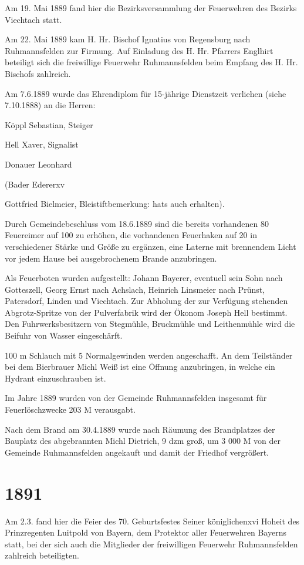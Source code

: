 \documentclass[12pt,a4paper]{book}
\begin{document}
Am 19. Mai 1889 fand hier die Bezirksversammlung der Feuerwehren des Bezirks
Viechtach statt.

Am 22. Mai 1889 kam H. Hr. Bischof Ignatius von Regensburg nach Ruhmannsfelden
zur Firmung. Auf Einladung des H. Hr. Pfarrers Englhirt beteiligt sich die
freiwillige Feuerwehr Ruhmannsfelden beim Empfang des H. Hr. Bischofs zahlreich.

Am 7.6.1889 wurde das Ehrendiplom für 15-jährige Dienstzeit verliehen (siehe
7.10.1888) an die Herren:

Köppl Sebastian, Steiger

Hell Xaver, Signalist

Donauer Leonhard

(Bader Edererxv

Gottfried Bielmeier, Bleistiftbemerkung: hats auch erhalten).

Durch Gemeindebeschluss vom 18.6.1889 sind die bereits vorhandenen 80 Feuereimer
auf 100 zu erhöhen, die vorhandenen Feuerhaken auf 20 in verschiedener Stärke
und Größe zu ergänzen, eine Laterne mit brennendem Licht vor jedem Hause bei
ausgebrochenem Brande anzubringen.

Als Feuerboten wurden aufgestellt: Johann Bayerer, eventuell sein Sohn nach
Gotteszell, Georg Ernst nach Achslach, Heinrich Linsmeier nach Prünst,
Patersdorf, Linden und Viechtach. Zur Abholung der zur Verfügung stehenden
Abgrotz-Spritze von der Pulverfabrik wird der Ökonom Joseph Hell bestimmt. Den
Fuhrwerksbesitzern von Stegmühle, Bruckmühle und Leithenmühle wird die Beifuhr
von Wasser eingeschärft.

100 m Schlauch mit 5 Normalgewinden werden angeschafft. An dem Teilständer bei
dem Bierbrauer Michl Weiß ist eine Öffnung anzubringen, in welche ein Hydrant
einzuschrauben ist.

Im Jahre 1889 wurden von der Gemeinde Ruhmannsfelden insgesamt für
Feuerlöschzwecke 203 M verausgabt.

Nach dem Brand am 30.4.1889 wurde nach Räumung des Brandplatzes der Bauplatz des
abgebrannten Michl Dietrich, 9 dzm groß, um 3 000 M von der Gemeinde
Ruhmannsfelden angekauft und damit der Friedhof vergrößert.

\section*{1891}

Am 2.3. fand hier die Feier des 70. Geburtsfestes Seiner königlichenxvi Hoheit
des Prinzregenten Luitpold von Bayern, dem Protektor aller Feuerwehren Bayerns
statt, bei der sich auch die Mitglieder der freiwilligen Feuerwehr
Ruhmannsfelden zahlreich beteiligten.
\end{document}
